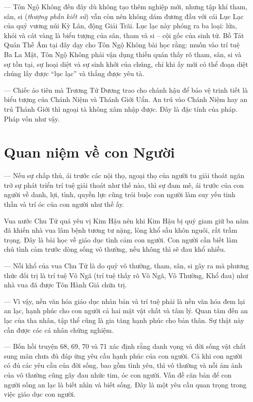 — Tôn Ngộ Không đến đây dù không tạo thêm nghiệp mới, nhưng tập khí tham, sân, si (\emph{thượng phần kiết sử}) vẫn còn nên không dám đương đầu với cái Lục Lạc của quỷ vương núi Kỳ Lân, động Giải Trãi. Lục lạc này phóng ra ba loại: lửa, khói và cát vàng là biểu tượng của sân, tham và si -- cội gốc của sinh tử. Bồ Tát Quán Thế Âm tại đây dạy cho Tôn Ngộ Không bài học rằng: muốn vào trí tuệ Ba La Mật, Tôn Ngộ Không phải vận dụng thiền quán thấy rõ tham, sân, si và sự tồn tại, sự hoại diệt và sự sinh khởi của chúng, chỉ khi ấy mới có thể đoạn diệt chúng lấy được ``lục lạc'' và thắng được yêu tà.

— Chiếc áo tiên mà Trương Tử Dương trao cho chánh hậu để bảo vệ trinh tiết là biểu tượng của Chánh Niệm và Thánh Giới Uẩn. An trú vào Chánh Niệm hay an trú Thánh Giới thì ngoại tà không xâm nhập được. Đây là đặc tính của pháp. Pháp vốn như vậy.

\section{Quan niệm về con Người} %
\label{sec:68_69_con_nguoi}

— Nếu sự chấp thủ, ái trước các nội thọ, ngoại thọ của người tu giải thoát ngăn trở sự phát triển trí tuệ giải thoát như thế nào, thì sự đam mê, ái trước của con người về danh, lợi, tình, quyền lực cũng trói buộc con người làm suy yếu tinh thần và trí óc của con người như thế ấy.

Vua nước Chu Tử quá yêu vị Kim Hậu nên khi Kim Hậu bị quỷ giam giữ ba năm đã khiến nhà vua lâm bệnh tương tư nặng, lòng khổ sầu khôn nguôi, rất trầm trọng. Đây là bài học về giáo dục tình cảm con người. Con người cần biết làm chủ tình cảm trước dòng sống vô thường, nếu không thì sẽ đau khổ nhiều.

— Nỗi khổ của vua Chu Tử là do quỷ vô thường, tham, sân, si gây ra mà phương thức đối trị là trí tuệ Vô Ngã (trí tuệ thấy rõ Vô Ngã, Vô Thường, Khổ đau) như nhà vua đã được Tôn Hành Giả chữa trị.

— Vì vậy, nền văn hóa giáo dục nhân bản và trí tuệ phải là nền văn hóa đem lại an lạc, hạnh phúc cho con người cả hai mặt vật chất và tâm lý. Quan tâm đến an lạc của tha nhân, tập thể cũng là gia tăng hạnh phúc cho bản thân. Sự thật này cần được các cá nhân chứng nghiệm.

— Bốn hồi truyện 68, 69, 70 và 71 xác định rằng danh vọng và đời sống vật chất sung mãn chưa đủ đáp ứng yêu cầu hạnh phúc của con người. Cả khi con người có đủ các yêu cầu của đời sống, bao gồm tình yêu, thì vô thường và nỗi ám ảnh của vô thường cũng gây đau nhức tim, óc con người. Vấn đề căn bản để con người sống an lạc là biết nhìn và biết sống. Đây là một yêu cầu quan trọng trong việc giáo dục con người.


